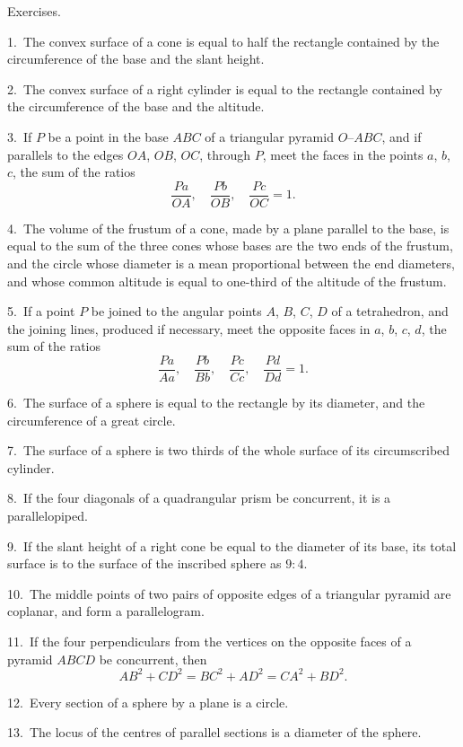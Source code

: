 \documentclass[oneside]{book}
\newcommand\exhead[1]{
\Needspace*{5\baselineskip}\begin{center}
\textsf{#1}
\end{center}
}
\begin{document}
\exhead{Exercises.}

\begin{footnotesize}
1.~The convex surface of a cone is equal to half the rectangle
contained by the circumference of the base and the slant height.

2.~The convex surface of a right cylinder is equal to the rectangle
contained by the circumference of the base and the altitude.

3.~If $P$ be a point in the base $ABC$ of a triangular pyramid
$O$--$ABC$, and if parallels to the edges $OA$, $OB$, $OC$, through $P$,
meet the faces in the points $a$, $b$, $c$, the sum of the ratios
\[
  \frac{Pa}{OA}, \quad
  \frac{Pb}{OB}, \quad
  \frac{Pc}{OC} = 1.
\]

4.~The volume of the frustum of a cone, made by a plane
parallel to the base, is equal to the sum of the three cones whose
bases are the two ends of the frustum, and the circle whose
diameter is a mean proportional between the end diameters, and
whose common altitude is equal to one-third of the altitude of the
frustum.

5.~If a point $P$ be joined to the angular points $A$, $B$, $C$, $D$ of a
tetrahedron, and the joining lines, produced if necessary, meet the
opposite faces in $a$, $b$, $c$, $d$, the sum of the ratios
\[
  \frac{Pa}{Aa}, \quad
  \frac{Pb}{Bb}, \quad
  \frac{Pc}{Cc}, \quad
  \frac{Pd}{Dd} = 1.
\]


6.~The surface of a sphere is equal to the rectangle by its
diameter, and the circumference of a great circle.

7.~The surface of a sphere is two thirds of the whole surface
of its circumscribed cylinder.

8.~If the four diagonals of a quadrangular prism be concurrent,
it is a parallelopiped.

9.~If the slant height of a right cone be equal to the diameter
of its base, its total surface is to the surface of the inscribed sphere
as $9 : 4$.

10.~The middle points of two pairs of opposite edges of a
triangular pyramid are coplanar, and form a parallelogram.

11.~If the four perpendiculars from the vertices on the opposite
faces of a pyramid $ABCD$ be concurrent, then
\[
AB^2 + CD^2 = BC^2 + AD^2 = CA^2 + BD^2.
\]

12.~Every section of a sphere by a plane is a circle.

13.~The locus of the centres of parallel sections is a diameter of
the sphere.


\end{footnotesize}
\end{document}
